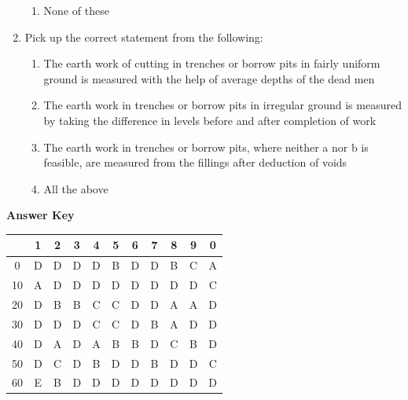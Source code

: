\documentclass[11pt,a4paper]{article}
\begin{document}
\begin{enumerate}
\begin{enumerate}[label=\Alph*.]
\item{None of these}
\end{enumerate}
\item{Pick up the correct statement from the following:}
\begin{enumerate}[label=\Alph*.]
\item{The earth work of cutting in trenches or borrow pits in fairly uniform ground is measured with the help of average depths of the dead men}
\item{The earth work in trenches or borrow pits in irregular ground is measured by taking the difference in levels before and after completion of work}
\item{The earth work in trenches or borrow pits, where neither a nor b is feasible, are measured from the fillings after deduction of voids}
\item{All the above}
\end{enumerate}
\end{enumerate}
\textbf{Answer Key}
\begin{tabular}{ | c | c c c c c c c c c c | }
\hline
 & 1 & 2 & 3 & 4 & 5 & 6 & 7 & 8 & 9 & 0 \\
\hline
0 & D & D & D & D & B & D & D & B & C & A \\
10 & A & D & D & D & D & D & D & D & D & C \\
20 & D & B & B & C & C & D & D & A & A & D \\
30 & D & D & D & C & C & D & B & A & D & D \\
40 & D & A & D & A & B & B & D & C & B & D \\
50 & D & C & D & B & D & D & B & D & D & C \\
60 & E & B & D & D & D & D & D & D & D & D \\
\hline
\end{tabular}
\clearpage
\end{document}

